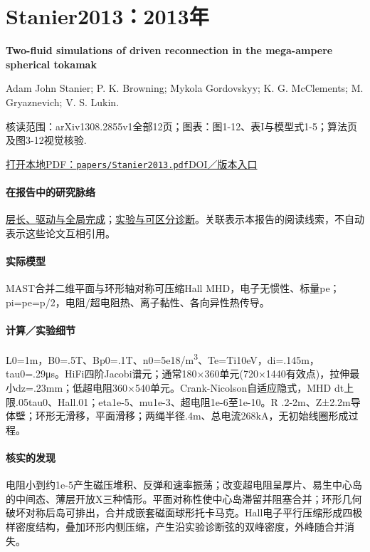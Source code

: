 \documentclass[UTF8,a4paper,11pt,openany,fontset=fandol]{ctexbook}
\begin{document}
\section{Stanier2013：2013年}\label{paper:Stanier2013}

\textbf{Two-fluid simulations of driven reconnection in the mega-ampere spherical tokamak}\citep{Stanier2013}\

Adam  John Stanier;  P. K. Browning;  Mykola Gordovskyy;  K. G. McClements;  M. Gryaznevich;  V. S. Lukin.

\textsf{核读范围：}arXiv1308.2855v1全部12页；\textsf{图表：}图1-12、表I与模型式1-5；算法页及图3-12视觉核验.

\href{run:../papers/Stanier2013.pdf}{打开本地PDF：\texttt{papers/Stanier2013.pdf}}\quad\href{https://doi.org/10.1063/1.4830104}{DOI／版本入口}

\paragraph{在报告中的研究脉络}\hyperref[story:global]{层长、驱动与全局完成}；\hyperref[story:diagnostic]{实验与可区分诊断}。关联表示本报告的阅读线索，不自动表示这些论文互相引用。

\paragraph{实际模型}MAST合并二维平面与环形轴对称可压缩Hall MHD，电子无惯性、标量pe；pi=pe=p/2，电阻/超电阻热、离子黏性、各向异性热传导。

\paragraph{计算／实验细节}L0=1m，B0=.5T、Bp0=.1T、n0=5e18/m\textsuperscript{3}、Te=Ti10eV，di=.145m，tau0=.29μs。HiFi四阶Jacobi谱元；通常180×360单元(720×1440有效点)，拉伸最小dz=.23mm；低超电阻360×540单元。Crank-Nicolson自适应隐式，MHD dt上限.05tau0、Hall.01；eta1e-5、mu1e-3、超电阻1e-6至1e-10。R .2-2m、Z±2.2m导体壁；环形无滑移，平面滑移；两绳半径.4m、总电流268kA，无初始线圈形成过程。

\paragraph{核实的发现}电阻小到约1e-5产生磁压堆积、反弹和速率振荡；改变超电阻呈厚片、易生中心岛的中间态、薄层开放X三种情形。平面对称性使中心岛滞留并阻塞合并；环形几何破坏对称后岛可排出，合并成嵌套磁面球形托卡马克。Hall电子平行压缩形成四极样密度结构，叠加环形内侧压缩，产生沿实验诊断弦的双峰密度，外峰随合并消失。
\end{document}
